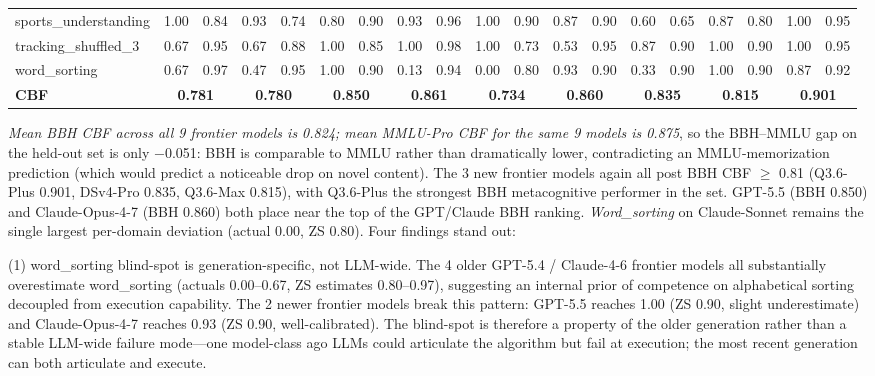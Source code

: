 \documentclass[11pt]{article}
\begin{document}
\begin{table}[h]
{\begin{tabular}{l cc cc cc cc cc cc cc cc cc}
sports\_understanding & 1.00 & 0.84 & 0.93 & 0.74 & 0.80 & 0.90 & 0.93 & 0.96 & 1.00 & 0.90 & 0.87 & 0.90 & 0.60 & 0.65 & 0.87 & 0.80 & 1.00 & 0.95 \\
tracking\_shuffled\_3 & 0.67 & 0.95 & 0.67 & 0.88 & 1.00 & 0.85 & 1.00 & 0.98 & 1.00 & 0.73 & 0.53 & 0.95 & 0.87 & 0.90 & 1.00 & 0.90 & 1.00 & 0.95 \\
word\_sorting         & 0.67 & 0.97 & 0.47 & 0.95 & 1.00 & 0.90 & 0.13 & 0.94 & 0.00 & 0.80 & 0.93 & 0.90 & 0.33 & 0.90 & 1.00 & 0.90 & 0.87 & 0.92 \\
\midrule
\textbf{CBF}          & \multicolumn{2}{c}{\textbf{0.781}} & \multicolumn{2}{c}{\textbf{0.780}} & \multicolumn{2}{c}{\textbf{0.850}} & \multicolumn{2}{c}{\textbf{0.861}} & \multicolumn{2}{c}{\textbf{0.734}} & \multicolumn{2}{c}{\textbf{0.860}} & \multicolumn{2}{c}{\textbf{0.835}} & \multicolumn{2}{c}{\textbf{0.815}} & \multicolumn{2}{c}{\textbf{0.901}} \\
\bottomrule
\end{tabular}}
\end{table}

\emph{Mean BBH CBF across all 9 frontier models is 0.824; mean MMLU-Pro CBF for the same 9 models is 0.875}, so the BBH--MMLU gap on the held-out set is only $-$0.051: BBH is comparable to MMLU rather than dramatically lower, contradicting an MMLU-memorization prediction (which would predict a noticeable drop on novel content). The 3 new frontier models again all post BBH CBF $\geq$ 0.81 (Q3.6-Plus 0.901, DSv4-Pro 0.835, Q3.6-Max 0.815), with Q3.6-Plus the strongest BBH metacognitive performer in the set. GPT-5.5 (BBH 0.850) and Claude-Opus-4-7 (BBH 0.860) both place near the top of the GPT/Claude BBH ranking. \emph{Word\_sorting} on Claude-Sonnet remains the single largest per-domain deviation (actual 0.00, ZS 0.80). Four findings stand out:

(1) word\_sorting blind-spot is generation-specific, not LLM-wide. The 4 older GPT-5.4 / Claude-4-6 frontier models all substantially overestimate word\_sorting (actuals 0.00--0.67, ZS estimates 0.80--0.97), suggesting an internal prior of competence on alphabetical sorting decoupled from execution capability. The 2 newer frontier models break this pattern: GPT-5.5 reaches 1.00 (ZS 0.90, slight underestimate) and Claude-Opus-4-7 reaches 0.93 (ZS 0.90, well-calibrated). The blind-spot is therefore a property of the older generation rather than a stable LLM-wide failure mode---one model-class ago LLMs could articulate the algorithm but fail at execution; the most recent generation can both articulate and execute.
\end{document}
